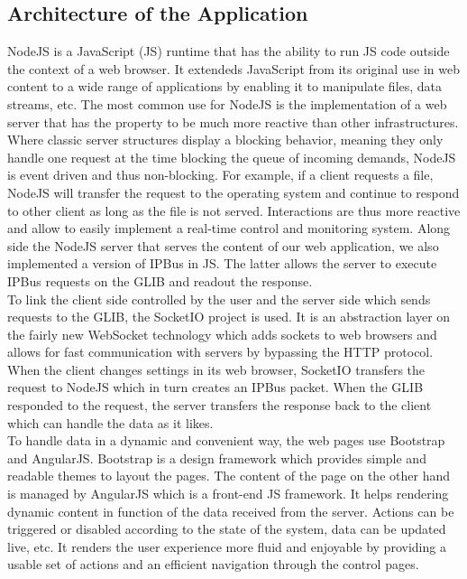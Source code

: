     \subsection{Architecture of the Application}

      NodeJS is a JavaScript (JS) runtime that has the ability to run JS code outside the context of a web browser. It extendeds JavaScript from its original use in web content to a wide range of applications by enabling it to manipulate files, data streams, etc. The most common use for NodeJS is the implementation of a web server that has the property to be much more reactive than other infrastructures. Where classic server structures display a blocking behavior, meaning they only handle one request at the time blocking the queue of incoming demands, NodeJS is event driven and thus non-blocking. For example, if a client requests a file, NodeJS will transfer the request to the operating system and continue to respond to other client as long as the file is not served. Interactions are thus more reactive and allow to easily implement a real-time control and monitoring system. Along side the NodeJS server that serves the content of our web application, we also implemented a version of IPBus in JS. The latter allows the server to execute IPBus requests on the GLIB and readout the response. \\

      To link the client side controlled by the user and the server side which sends requests to the GLIB, the SocketIO project is used. It is an abstraction layer on the fairly new WebSocket technology which adds sockets to web browsers and allows for fast communication with servers by bypassing the HTTP protocol. When the client changes settings in its web browser, SocketIO transfers the request to NodeJS which in turn creates an IPBus packet. When the GLIB responded to the request, the server transfers the response back to the client which can handle the data as it likes. \\

      To handle data in a dynamic and convenient way, the web pages use Bootstrap and AngularJS. Bootstrap is a design framework which provides simple and readable themes to layout the pages. The content of the page on the other hand is managed by AngularJS which is a front-end JS framework. It helps rendering dynamic content in function of the data received from the server. Actions can be triggered or disabled according to the state of the system, data can be updated live, etc. It renders the user experience more fluid and enjoyable by providing a usable set of actions and an efficient navigation through the control pages.

